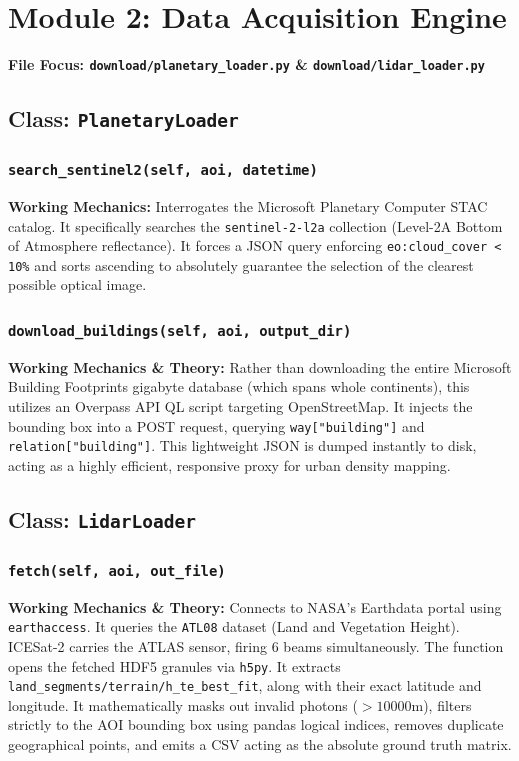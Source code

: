\documentclass[11pt,a4paper,oneside]{report}
\begin{document}
\chapter{Module 2: Data Acquisition Engine}
\textbf{File Focus: \texttt{download/planetary\_loader.py} \& \texttt{download/lidar\_loader.py}}

\section{Class: \texttt{PlanetaryLoader}}
\subsection{\texttt{search\_sentinel2(self, aoi, datetime)}}
\textbf{Working Mechanics:} Interrogates the Microsoft Planetary Computer STAC catalog. It specifically searches the \texttt{sentinel-2-l2a} collection (Level-2A Bottom of Atmosphere reflectance). It forces a JSON query enforcing \texttt{eo:cloud\_cover < 10\%} and sorts ascending to absolutely guarantee the selection of the clearest possible optical image.
\subsection{\texttt{download\_buildings(self, aoi, output\_dir)}}
\textbf{Working Mechanics \& Theory:} Rather than downloading the entire Microsoft Building Footprints gigabyte database (which spans whole continents), this utilizes an Overpass API QL script targeting OpenStreetMap. It injects the bounding box into a POST request, querying \texttt{way["building"]} and \texttt{relation["building"]}. This lightweight JSON is dumped instantly to disk, acting as a highly efficient, responsive proxy for urban density mapping.

\section{Class: \texttt{LidarLoader}}
\subsection{\texttt{fetch(self, aoi, out\_file)}}
\textbf{Working Mechanics \& Theory:} Connects to NASA's Earthdata portal using \texttt{earthaccess}. It queries the \texttt{ATL08} dataset (Land and Vegetation Height). ICESat-2 carries the ATLAS sensor, firing 6 beams simultaneously. The function opens the fetched HDF5 granules via \texttt{h5py}. It extracts \texttt{land\_segments/terrain/h\_te\_best\_fit}, along with their exact latitude and longitude. It mathematically masks out invalid photons ($> 10000$m), filters strictly to the AOI bounding box using pandas logical indices, removes duplicate geographical points, and emits a CSV acting as the absolute ground truth matrix.
\end{document}
